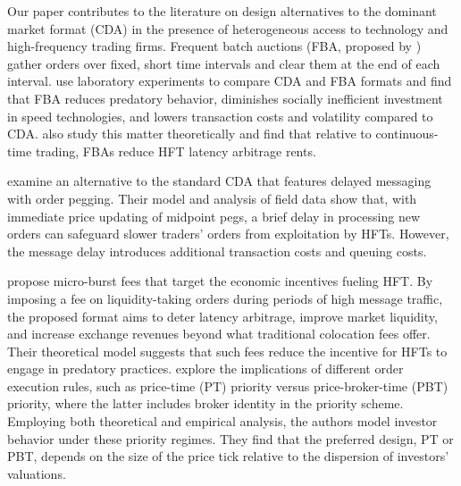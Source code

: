 \documentclass[12pt]{article}
\begin{document}
 

Our paper contributes to the literature on design alternatives to the dominant market format (CDA) in the presence of heterogeneous access to technology and high-frequency trading firms. 
Frequent batch auctions (FBA, proposed by \citealp{Budish2015}) gather orders over fixed, short time intervals and clear them at the end of each interval. %
\cite{Aldrich2019} use laboratory experiments to
compare CDA and FBA formats %
and find that FBA reduces predatory behavior, diminishes socially inefficient investment in  speed technologies, and lowers transaction costs and volatility compared to CDA. \cite{Haas2021} also study this matter theoretically and find that relative to continuous-time trading, FBAs reduce HFT latency arbitrage rents.

\cite{Aldrich2022} examine an alternative to the standard CDA that features delayed messaging with order pegging.  %
Their model and analysis of field data show that, with immediate price updating of midpoint pegs, a brief delay in processing new orders  can safeguard slower traders' orders from exploitation by HFTs. However, the message delay introduces additional transaction costs and queuing costs. 

\cite{brolley2023} propose micro-burst fees that target the economic incentives fueling HFT. By imposing a fee on liquidity-taking orders during periods of high message traffic, the proposed format aims to deter latency arbitrage, improve market liquidity, and increase exchange revenues beyond what traditional colocation fees offer. Their theoretical model suggests that such fees reduce the incentive for HFTs to engage in predatory practices. 
\cite{Degryse2022} explore the implications of different order execution rules, such as price-time (PT) priority versus price-broker-time (PBT) priority, where the latter includes broker identity in the priority scheme. Employing both theoretical and empirical analysis, the authors model investor behavior under these priority regimes. They find that the preferred design, PT or PBT, depends on the size of the price tick relative to the dispersion of investors' valuations. 
\end{document}
